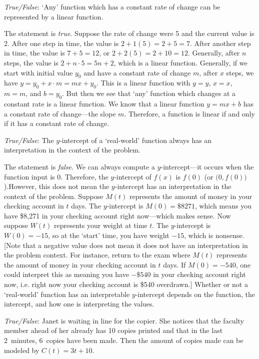 \documentclass[11pt,letterpaper]{article}
\begin{document}
\quizsol \textit{True/False}: `Any' function which has a constant rate of change can be represented by a linear function. \pspace

\sol The statement is \textit{true}. Suppose the rate of change were 5 and the current value is 2. After one step in time, the value is $2 + 1(5)= 2 + 5= 7$. After another step in time, the value is $7 + 5= 12$, or $2 + 2(5)= 2 + 10= 12$. Generally, after $n$ steps, the value is $2 + n \cdot 5= 5n + 2$, which is a linear function. Generally, if we start with initial value $y_0$ and have a constant rate of change $m$, after $x$ steps, we have $y= y_0 + x \cdot m= mx + y_0$. This is a linear function with $y= y$, $x= x$, $m= m$, and $b= y_0$. But then we see that `any' function which changes at a constant rate is a linear function. We know that a linear function $y= mx + b$ has a constant rate of change---the slope $m$. Therefore, a function is linear if and only if it has a constant rate of change. \pvspace{1.5cm}



\quizsol \textit{True/False}: The $y$-intercept of a `real-world' function always has an interpretation in the context of the problem. \pspace

\sol The statement is \textit{false}. We can always compute a $y$-intercept---it occurs when the function input is 0. Therefore, the $y$-intercept of $f(x)$ is $f(0)$ (or $\big(0, f(0) \big)$).However, this does not mean the $y$-intercept has an interpretation in the context of the problem. Suppose $M(t)$ represents the amount of money in your checking account in $t$ days. The $y$-intercept is $M(0)= \$8271$, which means you have \$8,271 in your checking account right now---which makes sense. Now suppose $W(t)$ represents your weight at time $t$. The $y$-intercept is $W(0)= -15$, so at the `start' time, you have weight $-15$, which is nonsense. [Note that a negative value does not mean it does not have an interpretation in the problem context. For instance, return to the exam where $M(t)$ represents the amount of money in your checking account in $t$ days. If $M(0)= -540$, one could interpret this as meaning you have $-\$540$ in your checking account right now, i.e. right now your checking account is \$540 overdrawn.] Whether or not a `real-world' function has an interpretable $y$-intercept depends on the function, the intercept, and how one is interpreting the values. \pvspace{1.5cm}



\quizsol \textit{True/False}: Janet is waiting in line for the copier. She notices that the faculty member ahead of her already has 10 copies printed and that in the last 2~minutes, 6~copies have been made. Then the amount of copies made can be modeled by $C(t)= 3t + 10$. \pspace
\end{document}

